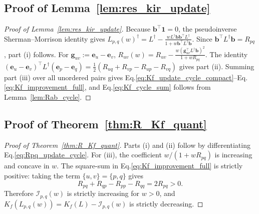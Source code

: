 \documentclass[11pt]{article}
\numberwithin{equation}{section}
\theoremstyle{definition}
\theoremstyle{remark}
\begin{document}
\subsection{Proof of Lemma~\ref{lem:res_kir_update}}
\begin{proof}[Proof of Lemma~\ref{lem:res_kir_update}]
	Because $\boldsymbol{b}^\top\boldsymbol{1}=0$, the pseudoinverse Sherman--Morrison identity gives $L_{p,q}(w)^\dagger
	=L^\dagger-
	\frac{wL^\dagger\boldsymbol{b}\boldsymbol{b}^\top L^\dagger}{1+w\boldsymbol{b}^\top L^\dagger\boldsymbol{b}}$. Since $\boldsymbol{b}^\top L^\dagger\boldsymbol{b}=R_{pq}$, part (i) follows.
	For $\boldsymbol{g}_{uv}:=\boldsymbol{e}_u-\boldsymbol{e}_v$, $R_{uv}(w)=R_{uv}-\frac{w(\boldsymbol{g}_{uv}^\top L^\dagger\boldsymbol{b})^2}{1+wR_{pq}}$.
	The identity $(\boldsymbol{e}_u-\boldsymbol{e}_v)^\top L^\dagger(\boldsymbol{e}_p-\boldsymbol{e}_q)
	=\frac12(R_{uq}+R_{vp}-R_{up}-R_{vq})$ gives part (ii).
	Summing part (iii) over all unordered pairs gives Eq.\eqref{eq:Kf_update_cycle_compact}--Eq.\eqref{eq:Kf_improvement_full}, and Eq.\eqref{eq:Kf_cycle_sum} follows from Lemma~\ref{lem:Rab_cycle}.
\end{proof}

\subsection{Proof of Theorem~\ref{thm:R_Kf_quant}}
\begin{proof}[Proof of Theorem~\ref{thm:R_Kf_quant}]
	Parts (i) and (ii) follow by differentiating Eq.\eqref{eq:Rpq_update_cycle}.
	For (iii), the coefficient $w/(1+wR_{pq})$ is increasing and concave in $w$.
	The square-sum in Eq.\eqref{eq:Kf_improvement_full} is strictly positive: taking the term $\{u,v\}=\{p,q\}$ gives
	\[
	R_{pq}+R_{qp}-R_{pp}-R_{qq}=2R_{pq}>0.
	\]
	Therefore $\mathcal I_{p,q}(w)$ is strictly increasing for $w>0$, and $K_f(L_{p,q}(w))=K_f(L)-\mathcal I_{p,q}(w)$ is strictly decreasing.
\end{proof}
\end{document}
